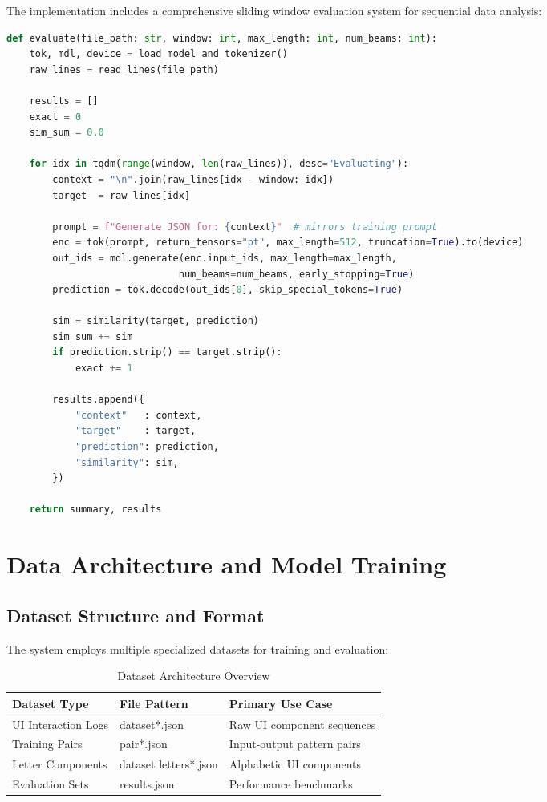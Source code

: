 \documentclass[12pt,a4paper]{article}
\begin{document}
The implementation includes a comprehensive sliding window evaluation system for sequential data analysis:

\begin{lstlisting}[caption=Sliding Window Evaluation Implementation, language=Python]
def evaluate(file_path: str, window: int, max_length: int, num_beams: int):
    tok, mdl, device = load_model_and_tokenizer()
    raw_lines = read_lines(file_path)
    
    results = []
    exact = 0
    sim_sum = 0.0

    for idx in tqdm(range(window, len(raw_lines)), desc="Evaluating"):
        context = "\n".join(raw_lines[idx - window: idx])
        target  = raw_lines[idx]

        prompt = f"Generate JSON for: {context}"  # mirrors training prompt
        enc = tok(prompt, return_tensors="pt", max_length=512, truncation=True).to(device)
        out_ids = mdl.generate(enc.input_ids, max_length=max_length, 
                              num_beams=num_beams, early_stopping=True)
        prediction = tok.decode(out_ids[0], skip_special_tokens=True)

        sim = similarity(target, prediction)
        sim_sum += sim
        if prediction.strip() == target.strip():
            exact += 1

        results.append({
            "context"   : context,
            "target"    : target,
            "prediction": prediction,
            "similarity": sim,
        })

    return summary, results
\end{lstlisting}

\section{Data Architecture and Model Training}

\subsection{Dataset Structure and Format}

The system employs multiple specialized datasets for training and evaluation:

\begin{table}[H]
\centering
\begin{tabular}{|l|l|l|}
\hline
\textbf{Dataset Type} & \textbf{File Pattern} & \textbf{Primary Use Case} \\
\hline
UI Interaction Logs & dataset*.json & Raw UI component sequences \\
Training Pairs & pair*.json & Input-output pattern pairs \\
Letter Components & dataset letters*.json & Alphabetic UI components \\
Evaluation Sets & results.json & Performance benchmarks \\
\hline
\end{tabular}
\caption{Dataset Architecture Overview}
\label{tab:dataset-structure}
\end{table}
\end{document}
